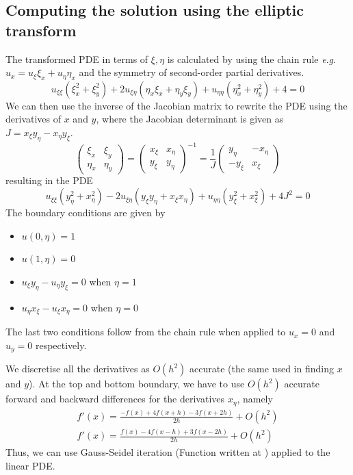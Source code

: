 \documentclass{article}
\numberwithin{equation}{section}
\theoremstyle{definition}
\newcommand{\eg}{\textit{e}.\textit{g}. }
\begin{document}
\subsection{Computing the solution using the elliptic transform}
The transformed PDE in terms of $\xi,\eta$ is calculated by using the chain rule \eg $u_x = u_\xi \xi_x + u_\eta \eta_x$ and the symmetry of second-order partial derivatives.
\begin{equation}
    u_{\xi\xi}(\xi_x^2 + \xi_y^2) + 2u_{\xi\eta}(\eta_x \xi_x + \eta_y \xi_y) + u_{\eta\eta} (\eta_x^2 + \eta_y^2) + 4 = 0
\end{equation}
We can then use the inverse of the Jacobian matrix to rewrite the PDE using the derivatives of $x$ and $y$, where the Jacobian determinant is given as $J = x_{\xi}y_{\eta} - x_{\eta}y_{\xi}$.
\begin{equation}
\begin{pmatrix}
    \xi_{x} & \xi_{y}\\
    \eta_{x} & \eta_{y}
    \end{pmatrix} =
    \begin{pmatrix}
    x_{\xi} & x_{\eta}\\ 
    y_{\xi} & y_{\eta}
    \end{pmatrix}^{-1} =
    \frac {1}{J}
    \begin{pmatrix}
    y_{\eta} & -x_{\eta}\\ 
    -y_{\xi} & x_{\xi}
    \end{pmatrix}
\end{equation}
resulting in the PDE
\begin{equation}
    u_{\xi\xi}(y_{\eta}^2 + x_{\eta}^2) - 2u_{\xi\eta}(y_\xi y_\eta + x_\xi x_\eta) + u_{\eta\eta} (y_{\xi}^2 + x_{\xi}^2) + 4J^2 = 0
\end{equation}
The boundary conditions are given by
\begin{itemize}
    \item $u(0,\eta) = 1$
    \item $u(1,\eta) = 0$
    \item $u_{\xi} y_{\eta} - u_{\eta} y_{\xi} = 0$ when $\eta=1$
    \item $u_{\eta} x_{\xi} - u_{\xi} x_{\eta} = 0$ when $\eta=0$
\end{itemize}
The last two conditions follow from the chain rule when applied to $u_x = 0$ and $u_y=0$ respectively.

We discretise all the derivatives as $O(h^2)$ accurate (the same used in finding $x$ and $y$). At the top and bottom boundary, we have to use $O(h^2)$ accurate forward and backward differences for the derivatives $x_{\eta}$, namely
\begin{align}
    f'(x) = \frac{-f(x) + 4f(x+h) - 3f(x+2h)}{2h} + O(h^2) \\
    f'(x) = \frac{f(x) - 4f(x-h) + 3f(x-2h)}{2h} + O(h^2) 
\end{align}
Thus, we can use Gauss-Seidel iteration (Function written at ) applied to the linear PDE.
\end{document}
